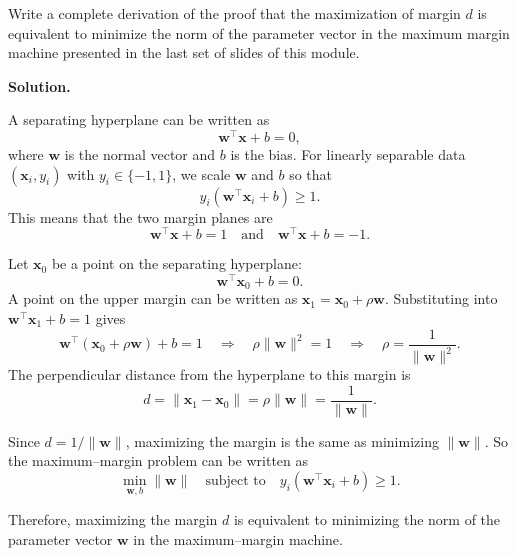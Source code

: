 \documentclass[11pt]{article}
\begin{document}
	\setlength{\parindent}{0pt}
	
	Write a complete derivation of the proof that the maximization of margin 
	$d$ is equivalent to minimize the norm of the parameter vector in the maximum margin machine presented in the last set of slides of this module. 
	
	\vspace{1em}
	\textbf{Solution.}
	
	A separating hyperplane can be written as
	\[
	\mathbf{w}^\top \mathbf{x} + b = 0,
	\]
	where $\mathbf{w}$ is the normal vector and $b$ is the bias.
	For linearly separable data $(\mathbf{x}_i, y_i)$ with $y_i \in \{-1, 1\}$, we scale $\mathbf{w}$ and $b$ so that
	\[
	y_i(\mathbf{w}^\top \mathbf{x}_i + b) \ge 1.
	\]
	This means that the two margin planes are
	\[
	\mathbf{w}^\top \mathbf{x} + b = 1
	\quad \text{and} \quad
	\mathbf{w}^\top \mathbf{x} + b = -1.
	\]
	
	Let $\mathbf{x}_0$ be a point on the separating hyperplane:
	\[
	\mathbf{w}^\top \mathbf{x}_0 + b = 0.
	\]
	A point on the upper margin can be written as $\mathbf{x}_1 = \mathbf{x}_0 + \rho \mathbf{w}$.
	Substituting into $\mathbf{w}^\top \mathbf{x}_1 + b = 1$ gives
	\[
	\mathbf{w}^\top (\mathbf{x}_0 + \rho \mathbf{w}) + b = 1
	\quad \Rightarrow \quad
	\rho \|\mathbf{w}\|^2 = 1
	\quad \Rightarrow \quad
	\rho = \frac{1}{\|\mathbf{w}\|^2}.
	\]
	The perpendicular distance from the hyperplane to this margin is
	\[
	d = \|\mathbf{x}_1 - \mathbf{x}_0\|
	= \rho \|\mathbf{w}\|
	= \frac{1}{\|\mathbf{w}\|}.
	\]
	
	Since $d = 1/\|\mathbf{w}\|$, maximizing the margin is the same as minimizing $\|\mathbf{w}\|$.
	So the maximum–margin problem can be written as
	\[
	\min_{\mathbf{w}, b} \|\mathbf{w}\|
	\quad \text{subject to} \quad
	y_i(\mathbf{w}^\top \mathbf{x}_i + b) \ge 1.
	\]
	
	\medskip
	Therefore, maximizing the margin $d$ is equivalent to minimizing the norm of the parameter vector $\mathbf{w}$ in the maximum–margin machine.
	
\end{document}

